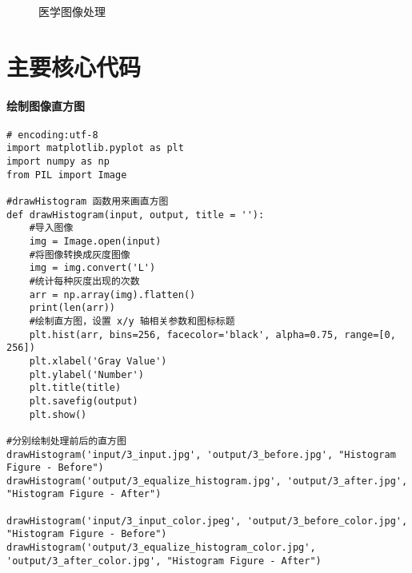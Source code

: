 \documentclass[11pt]{ctexart}
\begin{document}
     \begin{figure}[htbp]
        \centering
        \centering
        \caption{医学图像处理}\label{fig:digit}
  \end{figure}
  
  
\section{主要核心代码}

\paragraph{绘制图像直方图}

\lstset{language=python}
\begin{lstlisting}
# encoding:utf-8
import matplotlib.pyplot as plt
import numpy as np
from PIL import Image

#drawHistogram 函数用来画直方图
def drawHistogram(input, output, title = ''):
	#导入图像
	img = Image.open(input)
	#将图像转换成灰度图像
	img = img.convert('L')
	#统计每种灰度出现的次数
	arr = np.array(img).flatten()
	print(len(arr))
	#绘制直方图，设置 x/y 轴相关参数和图标标题
	plt.hist(arr, bins=256, facecolor='black', alpha=0.75, range=[0, 256])
	plt.xlabel('Gray Value')
	plt.ylabel('Number')
	plt.title(title)
	plt.savefig(output)
	plt.show()

#分别绘制处理前后的直方图
drawHistogram('input/3_input.jpg', 'output/3_before.jpg', "Histogram Figure - Before")
drawHistogram('output/3_equalize_histogram.jpg', 'output/3_after.jpg', "Histogram Figure - After")

drawHistogram('input/3_input_color.jpeg', 'output/3_before_color.jpg', "Histogram Figure - Before")
drawHistogram('output/3_equalize_histogram_color.jpg', 'output/3_after_color.jpg', "Histogram Figure - After")
\end{lstlisting}
\end{document}
